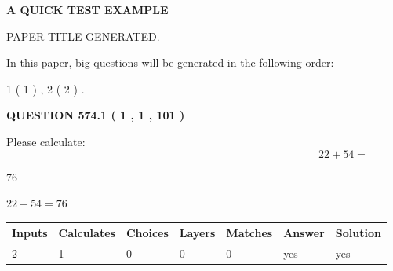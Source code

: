 \documentclass[12pt]{article}
\begin{document}
   
 \vspace{0.2in}
{\LARGE {\textbf{ A QUICK TEST EXAMPLE}}}
   
   
 PAPER TITLE GENERATED.
   
   
   
\vspace{0.2in}
   
In this paper, big questions will be generated in the following order: 
   
   
   1 ( 1 )
 ,
   2 ( 2 )
 .
  
\vspace{0.2in}
  
{\textbf{\Large{QUESTION
574.1 
 ( 1 , 1 , 101 )
}}}
  
  
 
Please calculate:
\begin{equation}
22 +  %
54 = \nonumber
\end{equation}
 
 
 
\noindent{}
 
 

76
 
 
\noindent{}
 
 

 
 
 
\noindent{}
 
 

$ %
22 +  %
54=   %
76$
 
 
\noindent{}
 
 

 
   
   
   
   
\noindent\begin{tabular}{|l|l|l|l|l|l|l|}
 \hline
Inputs & Calculates & Choices & Layers & Matches & Answer & Solution \\ \hline
 2  & 
 1  & 
 0
  & 
 0  & 
 0  & 
  yes & 
  yes 
  \\ \hline
 \end{tabular}
   
   
   
   
\noindent{}
   
\end{document}
